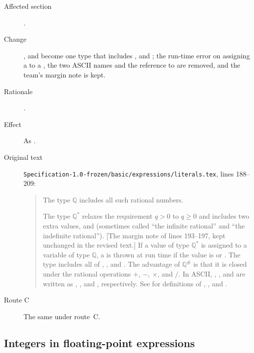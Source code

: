 \begin{description}
\item[Affected section] .
\item[Change] ,  and  become one
type that includes ,  and ; the run-time error on
assigning a  to a , the two ASCII names and the
reference to  are removed, and the team's margin note
is kept.
\item[Rationale] .
\item[Effect] As .
\item[Original text] \nolinkurl{Specification-1.0-frozen/basic/expressions/literals.tex},
lines 188--209:
\begin{quote}
The type $\mathbb{Q}$ includes all such rational numbers.

The type $\mathbb{Q}^*$ relaxes the requirement $q>0$ to $q \geq 0$ and
includes two extra values,  and  (sometimes called ``the
infinite rational'' and ``the indefinite rational'').
[The margin note of lines 193--197, kept unchanged in the revised text.]
If a value of type $\mathbb{Q}^*$ is assigned to a
variable of type $\mathbb{Q}$, a  is thrown
at run time if the value is  or .
The type  includes all of , , and
.
The advantage of $\mathbb{Q}^{\#}$ is that it is closed under the rational
operations $+$, $-$, $\times$, and $/$.
In ASCII, , , and
 are written as , , and
, respectively.
See  for definitions of , ,
and .
\end{quote}
\item[Route C] The same under route~C.
\end{description}

\subsection{Integers in floating-point expressions}

